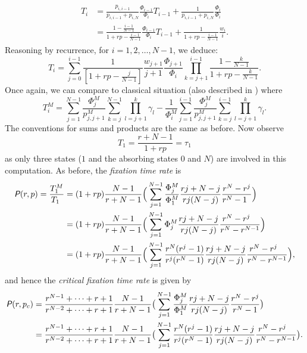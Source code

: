 \documentclass[a4paper,english,10pt]{amsart}
\newcommand{\Rho}{\emph{\textsf{P\hspace{0.1ex}}}}
\theoremstyle{definition}
\numberwithin{equation}{section}
\begin{document}
\begin{align}  \label{eq:eq_fix_complete}
\begin{split}
     T_i  & = \frac{p_{i,i-1}}{p_{i,i-1} + p_{i,N}} \frac{\Phi_{i-1}}{\Phi_i} T_{i-1} + 
      \frac{1}{p_{i,i-1} + p_{i,N}} \frac{\Phi_i}{\Phi_i} \\
          &  = \frac{1 - \frac{i-1}{N-1}}{1+rp - \frac{i-1}{N-1}} \frac{\Phi_{i-1}}{\Phi_i} T_{i-1} + 
      \frac{1}{1+rp - \frac{i-1}{N-1}}\frac{w_i}{i}. 
\end{split}
\end{align}
Reasoning by recurrence, for $i=1,2, \ldots, N-1$, we deduce: 
\begin{equation} \label{eq:fix_complete}
  T_i  = \sum_{j=0}^{i-1}  \frac{1}{[1+rp- \frac{j}{N-1}]} \frac{w_{j+1}}{j+1} \frac{\Phi_{j+1}}{\Phi_i} \prod_{k=j+1}^{i-1} \frac{1 - \frac{k}{N-1}}{1+rp - \frac{k}{N-1}}.
\end{equation}
Once again, we can compare to classical situation (also described in \cite{H}) where 
\begin{equation} \label{eq:fix_Moran}
  T^M_i  =  \sum_{j=1}^{N-1}  \frac{\Phi^M_j}{p^M_{j,j+1}} \sum_{k=j}^{N-1}\prod_{l=j+1}^{k} \gamma_l - \frac{1}{\Phi^M_i}\sum_{j=1}^{i-1}  \frac{\Phi^M_j}{p^M_{j,j+1}} \sum_{k=j}^{i-1}\prod_{l=j+1}^{k} \gamma_l.
\end{equation}
The conventions for sums and products are the same as before. Now observe
$$
T_1 = \frac{r+N-1}{1+rp} = \tau_1
$$
as only three states ($1$ and the absorbing states $0$ and $N$) are involved in this computation. As before, the \emph{fixation time rate} is
\begin{align} \label{eq:fix_rate}
\begin{split}
\Rho(r,p) = \frac{T_1^M}{T_1~} & =  (1+rp)\frac{N-1}{r+N-1} 
\Big( \sum_{j=1}^{N-1} \frac{\Phi^M_j}{\Phi^M_1}
\frac{rj+N-j}{rj(N-j)}\frac{r^N - r^j}{r^N-1\phantom{o}}  \Big)    \\ 
& = (1+rp)\frac{N-1}{r+N-1} 
\Big( \sum_{j=1}^{N-1} \Phi^M_j
\frac{rj+N-j}{rj(N-j)} \frac{r^N - r^j\phantom{m}}{r^N- r^{N-1}}  \Big)  \\
& = (1+rp)\frac{N-1}{r+N-1} 
\Big( \sum_{j=1}^{N-1} \frac{r^N(r^j -1)}{r^j(r^N-1)}
\frac{rj+N-j}{rj(N-j)}\frac{r^N - r^j\phantom{m}}{r^N- r^{N-1}}  \Big), \end{split}
\end{align}
and hence the \emph{critical fixation time rate} is given by
\begin{align} \label{eq:fix_criticalrate}
\begin{split}
\Rho(r,p_c)  & =  \frac{r^{N-1} + \cdots + r + 1}{r^{N-2} + \cdots + r +1}\frac{N-1}{r+N-1} 
\big(  \sum_{j=1}^{N-1}
\frac{\Phi^M_j}{\Phi^M_1} \frac{rj+N-j}{rj(N-j)}\frac{r^N - r^j}{r^N-1} \big)  \\ 
 & =  \frac{r^{N-1} + \cdots + r + 1}{r^{N-2} + \cdots + r +1}\frac{N-1}{r+N-1} 
\big( \sum_{j=1}^{N-1} \frac{r^N(r^j -1)}{r^j(r^N-1)}
\frac{rj+N-j}{rj(N-j)}\frac{r^N - r^j\phantom{m}}{r^N- r^{N-1} }  \big). 
\end{split}
\end{align}
\end{document}
